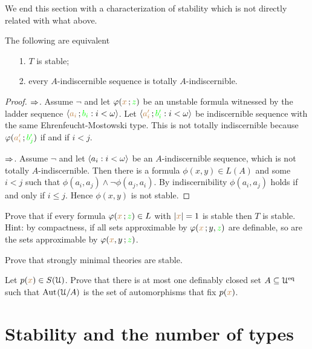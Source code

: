 \documentclass[creche.tex]{subfiles}
\begin{document}
We end this section with a characterization of stability which is not directly related with what above. 

\begin{proposition} The following are equivalent
\begin{itemize}
\item[1.] $T$ is stable;
\item[2.] every $A$-indiscernible sequence is totally $A$-indiscernible.
\end{itemize}
\end{proposition}

\begin{proof}
$\Rightarrow$. Assume $\neg$ and let $\varphi({\color{brown} x}\,;{\color{green} z})$ be an unstable formula witnessed by the ladder sequence $\langle{\color{brown}a_i}\,;{\color{green} b_i}:i<\omega\rangle$. Let $\langle{\color{brown}a'_i}\,;{\color{green} b'_i} : i<\omega\rangle$ be 
indiscernible sequence with the same Ehren\-feucht-Mostowski type. This is not totally indiscernible because $\varphi({\color{brown} a'_i}\,;{\color{green} b'_j})$ if and if $i< j$.

$\Rightarrow$. Assume $\neg$ and let $\langle a_i : i<\omega\rangle$ be an $A$-indiscernible sequence, which is not totally $A$-in\-dis\-cern\-ible. Then there is a formula $\phi(x, y)\in L(A)$ and some $i<j$ such that $\phi(a_i , a_j )\wedge\neg\phi(a_j , a_i) $. By indiscernibility  $\phi(a_i, a_j)$ holds if and only if $i\le j$. Hence $\phi(x, y)$ is not stable.
\end{proof}

\begin{exercise}
Prove that if every formula $\varphi({\color{brown} x}\,;{\color{green} z})\in L$ with $|{\color{brown} x}|=1$ is stable then $T$ is stable. Hint: by compactness, if all sets approximable by $\varphi({\color{brown} x}\,;y,{\color{green} z})$ are definable, so are the sets approximable by $\varphi({\color{brown} x},y\,;{\color{green} z})$.\QED
\end{exercise}


\begin{exercise}
Prove that strongly minimal theories are stable.\QED
\end{exercise}


\begin{exercise}\label{ex_Cb}
Let $p({\color{brown} x})\in S(\EuScript U)$. Prove that there is at most one definably closed set $A\subseteq\EuScript U^{{\rm eq}}$ such that $\textrm{Aut\kern.15ex}(\EuScript U/A)$ is the set of automorphisms that fix $p({\color{brown} x})$.\QED
\end{exercise}

\section{Stability and the number of types}
\end{document}
